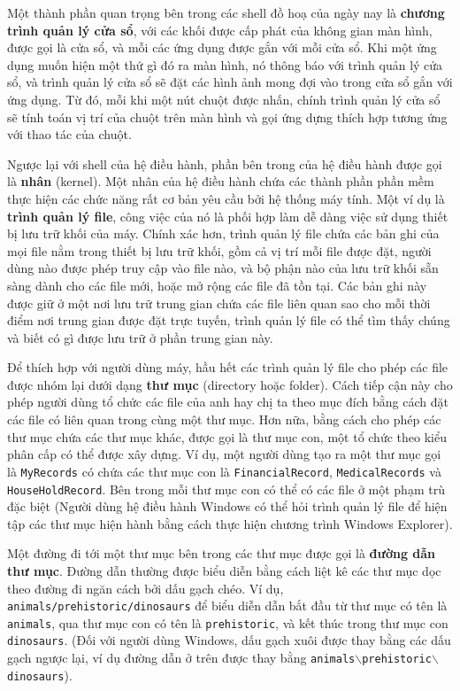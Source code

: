 Một thành phần quan trọng bên trong các shell đồ hoạ của ngày nay là \textbf{chương trình
  quản lý cửa sổ}, với các khối được cấp phát của không gian màn hình, được gọi là cửa sổ,
và mỗi các ứng dụng được gắn với mỗi cửa sổ. Khi một ứng dụng muốn hiện một thứ gì đó ra
màn hình, nó thông báo với trình quản lý cửa sổ, và trình quản lý cửa sổ sẽ đặt các hình
ảnh mong đợi vào trong cửa sổ gắn với ứng dụng. Từ đó, mỗi khi một nút chuột được nhấn,
chính trình quản lý cửa sổ sẽ tính toán vị trí của chuột trên màn hình và gọi ứng dựng
thích hợp tương ứng với thao tác của chuột.

Ngược lại với shell của hệ điều hành, phần bên trong của hệ điều hành được gọi là
\textbf{nhân} (kernel). Một nhân của hệ điều hành chứa các thành phần phần mềm thực hiện
các chức năng rất cơ bản yêu cầu bởi hệ thống máy tính. Một ví dụ là \textbf{trình quản lý
  file}, công việc của nó là phối hợp làm dễ dàng việc sử dụng thiết bị lưu trữ khối của
máy. Chính xác hơn, trình quản lý file chứa các bản ghi của mọi file nằm trong thiết bị
lưu trữ khối, gồm cả vị trí mỗi file được đặt, người dùng nào được phép truy cập vào file
nào, và bộ phận nào của lưu trữ khối sẵn sàng dành cho các file mới, hoặc mở rộng các file
đã tồn tại. Các bản ghi này được giữ ở một nơi lưu trữ trung gian chứa các file liên quan
sao cho mỗi thời điểm nơi trung gian được đặt trực tuyến, trình quản lý file có thể tìm
thấy chúng và biết có gì được lưu trữ ở phần trung gian này.

Để thích hợp với người dùng máy, hầu hết các trình quản lý file cho phép các file được
nhóm lại dưới dạng \textbf{thư mục} (directory hoặc folder). Cách tiếp cận này cho phép
người dùng tổ chức các file của anh hay chị ta theo mục đích bằng cách đặt các file có
liên quan trong cùng một thư mục. Hơn nữa, bằng cách cho phép các thư mục chứa các thư mục
khác, được gọi là thư mục con, một tổ chức theo kiểu phân cấp có thể được xây dựng. Ví dụ,
một người dùng tạo ra một thư mục gọi là \texttt{MyRecords} có chứa các thư mục con là
\texttt{FinancialRecord}, \texttt{MedicalRecords} và \texttt{HouseHoldRecord}. Bên trong
mỗi thư mục con có thể có các file ở một phạm trù đặc biệt (Người dùng hệ điều hành
Windows có thể hỏi trình quản lý file để hiện tập các thư mục hiện hành bằng cách thực
hiện chương trình Windows Explorer).

Một đường đi tới một thư mục bên trong các thư mục được gọi là \textbf{đường dẫn thư
  mục}. Đường dẫn thường được biểu diễn bằng cách liệt kê các thư mục dọc theo đường đi
ngăn cách bởi dấu gạch chéo. Ví dụ,  \texttt{animals/prehistoric/dinosaurs} để biểu
diễn dẫn bắt đầu từ thư mục có tên là \texttt{animals}, qua thư mục con có tên là
\texttt{prehistoric}, và kết thúc trong thư mục con \texttt{dinosaurs}. (Đối với người
dùng Windows, dấu gạch xuôi được thay bằng các dấu gạch ngược lại, ví dụ đường dẫn ở trên
được thay bằng \texttt{animals$\backslash$prehistoric$\backslash$dinosaurs}).

